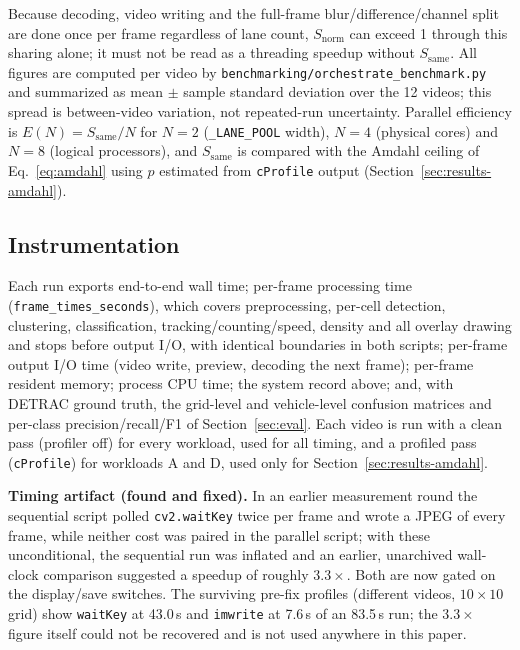 \documentclass[conference]{IEEEtran}
\newcommand{\code}[1]{\texttt{#1}}
\begin{document}
Because decoding, video writing and the full-frame
blur/difference/channel split are done once per frame regardless of lane
count, $S_{\text{norm}}$ can exceed 1 through this sharing alone; it must
not be read as a threading speedup without $S_{\text{same}}$. All figures
are computed per video by \code{benchmarking/orchestrate\_benchmark.py}
and summarized as mean $\pm$ sample standard deviation over the 12 videos;
this spread is between-video variation, not repeated-run uncertainty.
Parallel efficiency is $E(N)=S_{\text{same}}/N$ for $N=2$
(\code{\_LANE\_POOL} width), $N=4$ (physical cores) and $N=8$ (logical
processors), and $S_{\text{same}}$ is compared with the Amdahl ceiling of
Eq.~\eqref{eq:amdahl} using $p$ estimated from \code{cProfile} output
(Section~\ref{sec:results-amdahl}).

\subsection{Instrumentation}
\label{sec:instr}
Each run exports end-to-end wall time; per-frame processing time
(\code{frame\_times\_seconds}), which covers preprocessing, per-cell
detection, clustering, classification, tracking/counting/speed, density
and all overlay drawing and stops before output I/O, with identical
boundaries in both scripts; per-frame output I/O time (video write,
preview, decoding the next frame); per-frame resident memory; process CPU
time; the system record above; and, with DETRAC ground truth, the
grid-level and vehicle-level confusion matrices and per-class
precision/recall/F1 of Section~\ref{sec:eval}. Each video is run with a
clean pass (profiler off) for every workload, used for all timing, and a
profiled pass (\code{cProfile}) for workloads A and D, used only for
Section~\ref{sec:results-amdahl}.

\textbf{Timing artifact (found and fixed).}\label{sec:timingfix} In an
earlier measurement round the sequential script polled
\code{cv2.waitKey} twice per frame and wrote a JPEG of every frame, while
neither cost was paired in the parallel script; with these unconditional,
the sequential run was inflated and an earlier, unarchived wall-clock
comparison suggested a speedup of roughly $3.3\times$. Both are now gated
on the display/save switches. The surviving pre-fix profiles (different
videos, $10\times10$ grid) show \code{waitKey} at 43.0\,s and
\code{imwrite} at 7.6\,s of an 83.5\,s run; the $3.3\times$ figure itself
could not be recovered and is not used anywhere in this paper.
\end{document}
